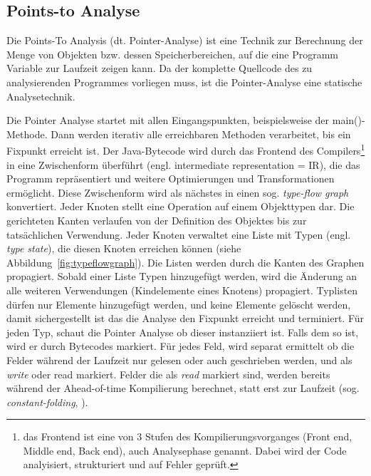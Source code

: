 \subsection{Points-to Analyse}
\label{subsec:pointsto}

Die Points-To Analysis (dt. Pointer-Analyse) ist eine Technik zur Berechnung der Menge von Objekten bzw. dessen Speicherbereichen, auf die eine Programm Variable zur Laufzeit zeigen kann\parencite{Hind2001, Smaragdakis2015}. 
Da der komplette Quellcode des zu analysierenden Programmes vorliegen muss, ist die Pointer-Analyse eine statische Analysetechnik.

Die Pointer Analyse startet mit allen Eingangspunkten, beispielsweise der main()-Methode. Dann werden iterativ alle erreichbaren Methoden verarbeitet, bis ein Fixpunkt erreicht ist. 
Der Java-Bytecode wird durch das Frontend des Compilers\footnote{das Frontend ist eine von 3 Stufen des Kompilierungsvorganges (Front end, Middle end, Back end), auch Analysephase genannt. Dabei wird der Code analyisiert, strukturiert und auf Fehler geprüft.} in eine Zwischenform 
überführt (engl. intermediate representation = IR), die das Programm repräsentiert und weitere Optimierungen und Transformationen ermöglicht\parencite{Simon2015}. Diese Zwischenform wird als nächstes in einen 
sog. \textit{type-flow graph} konvertiert. Jeder Knoten stellt eine Operation auf einem Objekttypen dar. Die gerichteten Kanten verlaufen von der Definition des Objektes bis zur tatsächlichen Verwendung. 
Jeder Knoten verwaltet eine Liste mit Typen (engl. \textit{type state}), die diesen Knoten erreichen können (siehe Abbildung~\ref{fig:typeflowgraph}). Die Listen werden durch die Kanten des Graphen propagiert. Sobald einer Liste Typen hinzugefügt werden, wird die Änderung an alle weiteren Verwendungen (Kindelemente eines Knotens) propagiert. Typlisten dürfen nur Elemente hinzugefügt werden, und keine Elemente gelöscht werden, damit sichergestellt ist das die Analyse den Fixpunkt erreicht und terminiert. Für jeden Typ, schaut die Pointer Analyse ob  dieser instanziiert ist. Falls dem so ist, wird er 
 durch Bytecodes markiert. Für jedes Feld, wird separat ermittelt ob die Felder während der Laufzeit nur gelesen oder auch geschrieben werden\parencite{Wimmer2019}, und als \textit{write} oder {read} markiert. Felder die als \textit{read} markiert sind, werden bereits während der Ahead-of-time Kompilierung berechnet, statt erst zur Laufzeit (sog. \textit{constant-folding}, \parencite[Kapitel 4.2]{Grumberg2014}).

